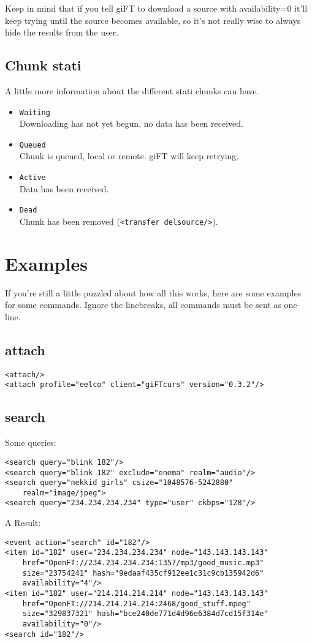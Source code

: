 \documentclass[10pt]{article}
\begin{document}
Keep in mind that if you tell giFT to download a source with availability=0
it'll keep trying until the source becomes available, so it's not really wise
to always hide the results from the user.

\subsection{Chunk stati}
A little more information about the different stati chunks can have.
\begin{itemize}
\item\verb|Waiting|\\
Downloading has not yet begun, no data has been received.
\item\verb|Queued|\\
Chunk is queued, local or remote. giFT will keep retrying.
\item\verb|Active|\\
Data has been received.
\item\verb|Dead|\\
Chunk has been removed (\verb|<transfer delsource/>|).
\end{itemize}

\section{Examples}
If you're still a little puzzled about how all this works, here are some
examples for some commands. Ignore the linebreaks, all commands must be sent as
one line.

\subsection{attach}
\begin{verbatim}
<attach/>
<attach profile="eelco" client="giFTcurs" version="0.3.2"/>
\end{verbatim}

\subsection{search}
Some queries:
\begin{verbatim}
<search query="blink 182"/>
<search query="blink 182" exclude="enema" realm="audio"/>
<search query="nekkid girls" csize="1048576-5242880"
    realm="image/jpeg">
<search query="234.234.234.234" type="user" ckbps="128"/>
\end{verbatim}

A Result:
\begin{verbatim}
<event action="search" id="182"/>
<item id="182" user="234.234.234.234" node="143.143.143.143"
    href="OpenFT://234.234.234.234:1357/mp3/good_music.mp3"
    size="23754241" hash="9edaaf435cf912ee1c31c9cb135942d6"
    availability="4"/>
<item id="182" user="214.214.214.214" node="143.143.143.143"
    href="OpenFT://214.214.214.214:2468/good_stuff.mpeg"
    size="329837321" hash="bce240de771d4d96e6384d7cd15f314e"
    availability="0"/>
<search id="182"/> 
\end{verbatim}
\end{document}
